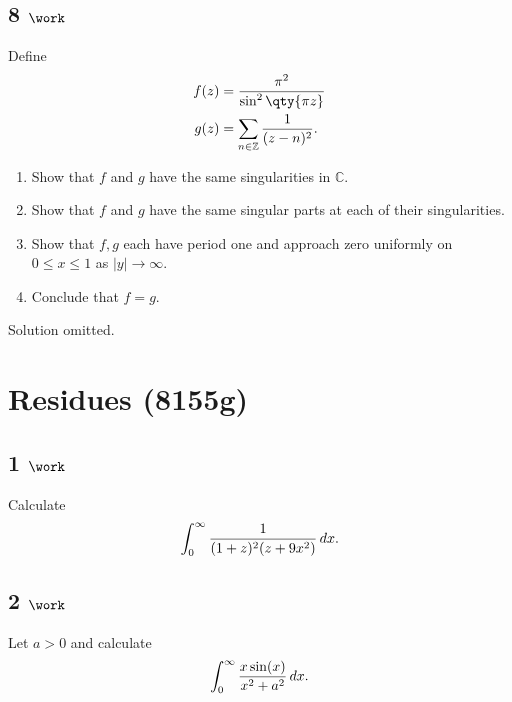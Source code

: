 \hypertarget{work-47}{%
\subsection{\texorpdfstring{8
\(\work\)}{8 \textbackslash work}}\label{work-47}}

Define
\begin{align*}
f(z) &= {\pi^2 \over \sin^2 \qty{\pi z} } \\
g(z) &= \sum_{n\in {\mathbb{Z}}} {1\over (z-n)^2}
.\end{align*}

\begin{enumerate}
\def\labelenumi{\alph{enumi}.}
\tightlist
\item
  Show that \(f\) and \(g\) have the same singularities in
  \({\mathbb{C}}\).
\item
  Show that \(f\) and \(g\) have the same singular parts at each of
  their singularities.
\item
  Show that \(f, g\) each have period one and approach zero uniformly on
  \(0\leq x \leq 1\) as \({\left\lvert {y} \right\rvert}\to \infty\).
\item
  Conclude that \(f = g\).
\end{enumerate}


Solution omitted.

\hypertarget{residues-8155g}{%
\section{Residues (8155g)}\label{residues-8155g}}

\hypertarget{work-48}{%
\subsection{\texorpdfstring{1
\(\work\)}{1 \textbackslash work}}\label{work-48}}

Calculate
\begin{align*}
\int_0^\infty {1 \over (1+z)^2 (z+9x^2)} \, dx
.\end{align*}

\hypertarget{work-49}{%
\subsection{\texorpdfstring{2
\(\work\)}{2 \textbackslash work}}\label{work-49}}

Let \(a>0\) and calculate
\begin{align*}
\int_0^\infty {x\sin(x) \over x^2 + a^2} \,dx
.\end{align*}

